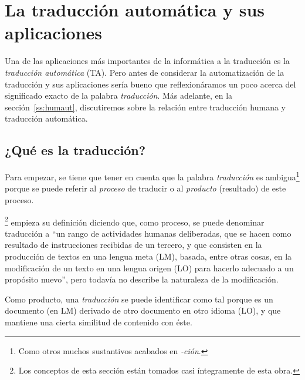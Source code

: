 \chapter[Traducción automática y aplicaciones]{La traducción automática y sus aplicaciones} \label{se:UTA} \label{se:TiTA} 

Una de las aplicaciones más importantes de la informática a la traducción es la \emph{traducción automática} (TA). Pero antes de considerar la automatización de la traducción y sus aplicaciones sería bueno que reflexionáramos un poco acerca del significado exacto de la palabra \emph{traducción}. Más adelante, en la sección~\ref{ss:humaut}, discutiremos sobre la relación entre traducción humana y traducción automática. 

\section{¿Qué es la traducción?} \label{ss:trad} 

Para empezar, se tiene que tener en cuenta que la palabra \emph{traducción} es ambigua\footnote{Como otros muchos sustantivos acabados en \emph{-ción}.} porque se puede referir al \emph{proceso} de traducir o al \emph{producto} (resultado) de este proceso. 

\citet{sager93b}\footnote{Los conceptos de esta sección están tomados casi íntegramente de esta obra.} empieza su definición diciendo que, como proceso, se puede denominar traducción a ``un rango de actividades humanas deliberadas, que se hacen como resultado de instrucciones recibidas de un tercero, y que consisten en la producción de textos en una lengua meta (LM), basada, entre otras cosas, en la modificación de un texto en una lengua origen (LO) para hacerlo adecuado a un propósito nuevo'', pero todavía no describe la naturaleza de la modificación. 

Como producto, una \emph{traducción} se puede identificar como tal porque es un documento (en LM) derivado de otro documento en otro idioma (LO), y que mantiene una cierta similitud de contenido con éste. 

